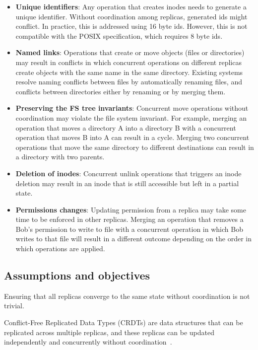 \documentclass[sigconf, anonymous, 10pt]{acmart}
\begin{document}
\begin{itemize}
	\item \textbf{Unique identifiers}: Any operation that creates
	inodes needs to generate a unique identifier.
	Without coordination among replicas, generated ids might conflict.
	In practice, this is addressed using 16 byte ids.
	However, this is not compatible with the POSIX specification, which requires 8 byte ids.
	\item \textbf{Named links}: Operations that create or move objects (files or directories)
	may result in conflicts in which concurrent operations on different replicas create
	objects with the same name in the same directory.
	Existing systems resolve naming conflicts between files by automatically renaming
  files, and conflicts between directories either by renaming or by merging them.
	\item \textbf{Preserving the FS tree invariants}: Concurrent move
	operations without coordination may violate the file system invariant.
  For example, merging an operation that moves a directory A into a
	directory B with a concurrent operation that moves B into A can result in a cycle.
  Merging two concurrent operations that move the same directory
	to different destinations can result in a directory with two parents.
  \item \textbf{Deletion of inodes}: Concurrent unlink operations
  that triggers an inode deletion may result in an inode that is still accessible but left in a partial state.
  \item \textbf{Permissions changes}: Updating permission from a replica may take some time to be enforced in other replicas.
  Merging an operation that removes a Bob's permission to write to file with a concurrent operation in which Bob writes
  to that file will result in a different outcome depending on the order in which operations are applied.
\end{itemize}

\subsection{Assumptions and objectives}

Ensuring that all replicas converge to the same state without coordination
is not trivial.

Conflict-Free Replicated Data Types (CRDTs) are data structures that
can be replicated across multiple replicas,
and these replicas can be updated independently and concurrently without coordination~\cite{shapiro2011conflict}.
\end{document}
